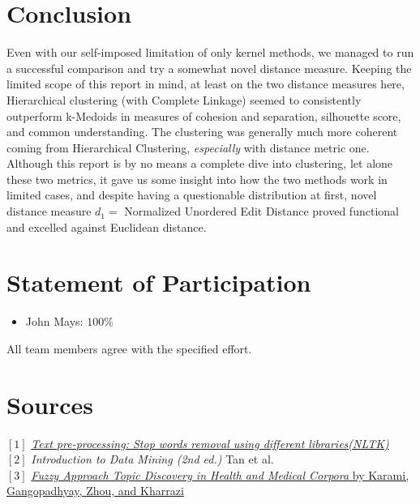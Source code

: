 \documentclass[fleqn]{article}
\begin{document}
\section{Conclusion}
Even with our self-imposed limitation of only kernel methods, we managed to run a successful comparison and try a somewhat novel distance measure.  Keeping the limited scope of this report in mind, at least on the two distance measures here, Hierarchical clustering (with Complete Linkage) seemed to consistently outperform k-Medoids in measures of cohesion and separation, silhouette score, and common understanding.  The clustering was generally much more coherent coming from Hierarchical Clustering, \textit{especially} with distance metric one.  Although this report is by no means a complete dive into clustering, let alone these two metrics, it gave us some insight into how the two methods work in limited cases, and despite having a questionable distribution at first, novel distance measure $d_1=$ Normalized Unordered Edit Distance proved functional and excelled against Euclidean distance.


\section*{Statement of Participation}
\begin{itemize}
	\item John Mays: $100\%$
\end{itemize}
All team members agree with the specified effort.

\section*{Sources}
$[1]$ \href{https://towardsdatascience.com/text-pre-processing-stop-words-removal-using-different-libraries-f20bac19929a}{\textit{Text pre-processing: Stop words removal using different libraries(NLTK)}}\\
$[2]$ \textit{Introduction to Data Mining (2nd ed.)} Tan et al.\\
$[3]$ \href{https://arxiv.org/abs/1705.00995}{\textit{Fuzzy Approach Topic Discovery in Health and Medical Corpora} by Karami, Gangopadhyay, Zhou, and Kharrazi}
\end{document}
